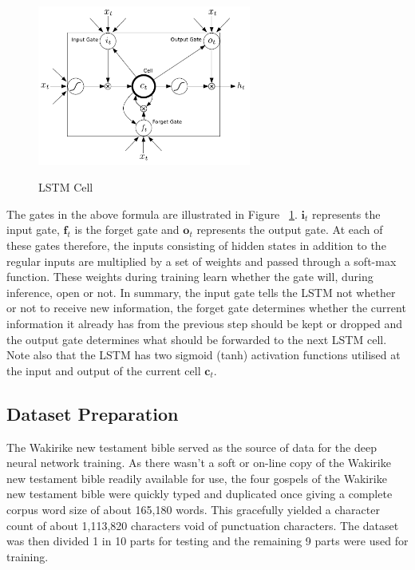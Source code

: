 \documentclass[a4paper]{article}
\begin{document}
\begin{figure}
\centering
  \includegraphics[width=7cm]{lstmcell}\\
  \caption{LSTM Cell \cite{graves2013hybrid}}\label{fig1:lstmcell}
\end{figure}

The gates in the above formula are illustrated in Figure ~\ref{fig1:lstmcell}.  $\mathbf{i}_t$ represents the input gate, $\mathbf{f}_t$ is the forget gate and $\mathbf{o}_t$ represents the output gate.  At each of these gates therefore, the inputs consisting of hidden states in addition to the regular inputs are multiplied by a set of weights and passed through a soft-max function. These weights during training learn whether the gate will, during inference, open or not. In summary, the input gate tells the LSTM not whether or not to receive new information, the forget gate determines whether the current information it already has from the previous step should be kept or dropped and the output gate determines what should be forwarded to the next LSTM cell.  Note also that the LSTM has two sigmoid (tanh) activation functions utilised at the input and output of the current cell $\mathbf{c}_t$.

\subsection{Dataset Preparation}
The Wakirike new testament bible served as the source of data for the deep neural network training.  As there wasn't a soft or on-line copy of the Wakirike new testament bible readily available for use, the four gospels of the Wakirike new testament bible were quickly typed and duplicated once giving a complete corpus word size of about 165,180 words.  This gracefully yielded a character count of about 1,113,820 characters void of punctuation characters. The dataset was then divided 1 in 10 parts for testing and the remaining 9 parts were used for training.
\end{document}
